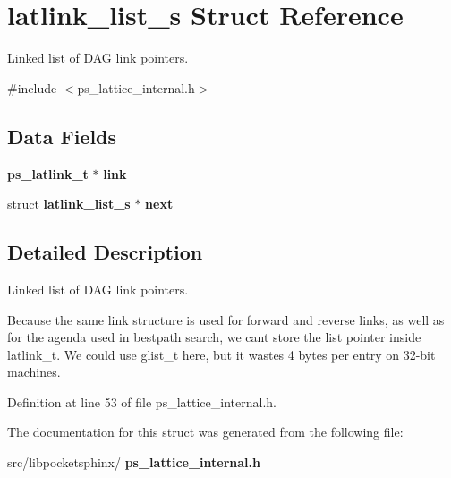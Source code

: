 \section{latlink\+\_\+list\+\_\+s Struct Reference}
\label{structlatlink__list__s}


Linked list of D\+AG link pointers.  




{\ttfamily \#include $<$ps\+\_\+lattice\+\_\+internal.\+h$>$}

\subsection*{Data Fields}
\begin{DoxyCompactItemize}
\item 
\mbox{\label{structlatlink__list__s_accd8f5fdb23871b66b81c830e3808068}} 
\textbf{ ps\+\_\+latlink\+\_\+t} $\ast$ {\bfseries link}
\item 
\mbox{\label{structlatlink__list__s_a17b319bb0f536542267496afecc8de10}} 
struct \textbf{ latlink\+\_\+list\+\_\+s} $\ast$ {\bfseries next}
\end{DoxyCompactItemize}


\subsection{Detailed Description}
Linked list of D\+AG link pointers. 

Because the same link structure is used for forward and reverse links, as well as for the agenda used in bestpath search, we can\textquotesingle{}t store the list pointer inside latlink\+\_\+t. We could use glist\+\_\+t here, but it wastes 4 bytes per entry on 32-\/bit machines. 

Definition at line 53 of file ps\+\_\+lattice\+\_\+internal.\+h.



The documentation for this struct was generated from the following file\+:\begin{DoxyCompactItemize}
\item 
src/libpocketsphinx/\textbf{ ps\+\_\+lattice\+\_\+internal.\+h}\end{DoxyCompactItemize}
